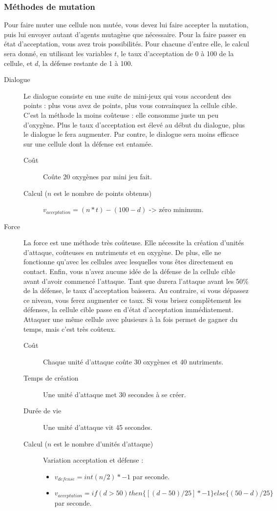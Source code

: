 \documentclass{article}
\begin{document}
\subsubsection{Méthodes de mutation}\label{muta}
Pour faire muter une cellule non mutée, vous devez lui faire accepter la mutation, puis lui envoyer autant d'agents mutagène que nécessaire. Pour la faire passer en état d'acceptation, vous avez trois possibilités. Pour chacune d'entre elle, le calcul sera donné, en utilisant les variables $t$, le taux d'acceptation de 0 à 100 de la cellule, et $d$, la défense restante de 1 à 100.
\begin{description}
	\item[Dialogue]\label{dialogue}
		Le dialogue consiste en une suite de mini-jeux qui vous accordent des points : plus vous avez de points, plus vous convainquez la cellule cible. C'est la méthode la moins coûteuse : elle consomme juste un peu d'oxygène. Plus le taux d'acceptation est élevé au début du dialogue, plus le dialogue le fera augmenter. Par contre, le dialogue sera moins efficace sur une cellule dont la défense est entamée.\\
		\begin{description}
			\item[Coût] Coûte 20 oxygènes par mini jeu fait.
			\item[Calcul ($n$ est le nombre de points obtenus)] $v_{acceptation} = (n*t) - (100-d)$ -> zéro minimum.
		\end{description}

	\item[Force]\label{force}
		La force est une méthode très coûteuse. Elle nécessite la création d'unités d'attaque, coûteuses en nutriments et en oxygène. De plus, elle ne fonctionne qu'avec les cellules avec lesquelles vous êtes directement en contact. Enfin, vous n'avez aucune idée de la défense de la cellule cible avant d'avoir commencé l'attaque. Tant que durera l'attaque avant les 50\% de la défense, le taux d'acceptation baissera. Au contraire, si vous dépassez ce niveau, vous ferez augmenter ce taux. Si vous brisez complètement les défenses, la cellule cible passe en d'état d'acceptation immédiatement. Attaquer une même cellule avec plusieurs à la fois permet de gagner du temps, mais c'est très coûteux.
		\begin{description}
			\item[Coût] Chaque unité d'attaque coûte 30 oxygènes et 40 nutriments.
			\item[Temps de création] Une unité d'attaque met 30 secondes à se créer.
			\item[Durée de vie] Une unité d'attaque vit 45 secondes.
			\item[Calcul ($n$ est le nombre d'unités d'attaque)] Variation acceptation et défense :\\
				\begin{itemize}
					\item $v_{defense} = int(n/2) * -1$ par seconde.
					\item $v_{acceptation} = if(d>50) then\{ [(d-50) / 25] * -1 \} else\{ (50-d) / 25\}$ par seconde.
				\end{itemize}
		\end{description}


\end{description}
\end{document}
